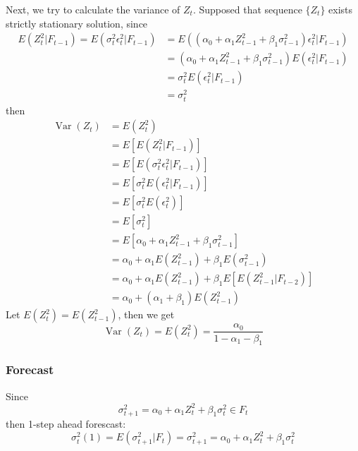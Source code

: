 \documentclass{article}
\begin{document}
\noindent Next, we try to calculate the variance of $Z_t$. Supposed that sequence $\{Z_t\}$ exists strictly stationary solution, since
\begin{equation*}
\begin{aligned}
E\left(Z_{t}^{2} | F_{t-1}\right) = E\left(\sigma_t^2\epsilon_t^2 | F_{t-1}\right) &= E\left((\alpha_{0}+\alpha_{1} Z_{t-1}^{2}+\beta_{1}\sigma_{t-1}^{2})\epsilon_t^2 | F_{t-1}\right)\\ &= (\alpha_{0}+\alpha_{1} Z_{t-1}^{2}+\beta_{1}\sigma_{t-1}^{2}) E\left(\epsilon_t^2 | F_{t-1}\right)\\ &= \sigma_t^2 E\left(\epsilon_t^2 | F_{t-1}\right)\\ &= \sigma_t^2
\end{aligned}
\end{equation*}
then
\begin{equation*}
\begin{aligned} \operatorname{Var}\left(Z_{t}\right) &=E\left(Z_{t}^{2}\right) \\ &=E\left[E\left(Z_{t}^{2} | F_{t-1}\right)\right] \\ &=E\left[E\left(\sigma_{t}^{2} \epsilon_{t}^{2} | F_{t-1}\right)\right] \\ &=E\left[\sigma_{t}^{2} E\left(\epsilon_{t}^{2} | F_{t-1}\right)\right] \\ &=E\left[\sigma_{t}^{2} E\left(\epsilon_{t}^{2}\right)\right] \\ &=E\left[\sigma_{t}^{2}\right] \\ &=E\left[\alpha_{0}+\alpha_{1} Z_{t-1}^{2}+\beta_{1} \sigma_{t-1}^{2}\right] \\ &= \alpha_{0}+\alpha_{1} E\left(Z_{t-1}^{2}\right)+\beta_{1} E\left(\sigma_{t-1}^{2}\right)\\ &=\alpha_{0}+\alpha_{1} E\left(Z_{t-1}^{2}\right)+\beta_{1} E\left[E\left(Z_{t-1}^{2} | F_{t-2}\right)\right] \\ &=\alpha_{0}+\left(\alpha_{1}+\beta_{1}\right) E\left(Z_{t-1}^{2}\right) \end{aligned}
\end{equation*}
Let $E (Z_{t}^{2}) = E (Z_{t-1}^{2})$, then we get
\begin{equation*}
\operatorname{Var}\left(Z_{t}\right)=E (Z_{t}^{2})=\frac{\alpha_{0}}{1-\alpha_{1}-\beta_{1}}
\end{equation*}

\subsubsection{Forecast}
Since
\begin{equation*}
\sigma_{t+1}^{2}=\alpha_{0}+\alpha_{1} Z_{t}^{2}+\beta_{1} \sigma_{t}^{2} \in F_{t}
\end{equation*}
then 1-step ahead forescast:
\begin{equation*}
\sigma_{t}^{2}(1)=E\left(\sigma_{t+1}^{2} | F_{t}\right)=\sigma_{t+1}^{2}=\alpha_{0}+\alpha_{1} Z_{t}^{2}+\beta_{1} \sigma_{t}^{2}
\end{equation*}
\end{document}
